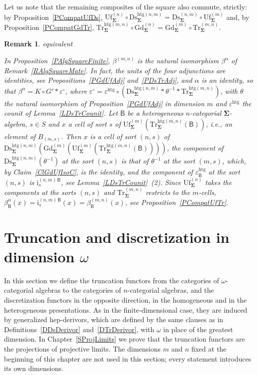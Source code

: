 \documentclass[a4paper, reqno]{amsbook}
\makeatletter
\newcommand{\sig}[1]{\mathbf{#1}}             %
\newcommand{\calg}[1]{\boldsymbol{\mathsf{#1}}} %
\newcommand{\htg}{\mathrm{htg}}                %
\newcommand{\Gd}{\mathrm{Gd}}
\newcommand{\Uf}{\mathrm{Uf}}
\newcommand{\Ds}{\mathrm{Ds}}
\newcommand{\Tr}{\mathrm{Tr}}
\theoremstyle{plain}
\newtheorem{remark}[theorem]{Remark}
\theoremstyle{definition}
\newcommand*{\CA@leanpending}{}
\newcommand*{\CA@leanrelation}{}
\newcommand*{\lean}[2]{%
  \ifcsname\string\color@lean@#1\endcsname\else
    \PackageError{main}{Unknown relation `#1' in \string\lean}{Use equivalent, weaker or stronger.}%
  \fi
  \gdef\CA@leanrelation{#1}%
  \gdef\CA@leanpending{#2}}
\makeatother
\begin{document}
Let us note that the remaining composites of the square also commute, strictly: by Proposition~\ref{PCompatUfDs}, $\Uf^{(n)}_{\sig{\Sigma}}\circ\Ds^{\htg(n,m)}_{\sig{\Sigma}}=\Ds^{(n,m)}_{\sig{\Sigma}}\circ\Uf^{(m)}_{\sig{\Sigma}}$ and, by Proposition~\ref{PCompatGdTr}, $\Tr^{\htg(m,n)}_{\sig{\Sigma}}\circ\Gd^{(n)}_{\sig{\Sigma}}=\Gd^{(m)}_{\sig{\Sigma}}\circ\Tr^{(m,n)}_{\sig{\Sigma}}$.

\begin{remark}\label{RAlgSquareFiniteMate}\lean{equivalent}{Dimensions.truncationUnificationFunctor_eq_conjugate}
In Proposition~\ref{PAlgSquareFinite}, $\beta^{(m,n)}$ is the natural isomorphism $\beta^{\alpha}$ of Remark~\ref{RAlgSquareMate}.
In fact, the units of the four adjunctions are identities, see Propositions~\ref{PGdUfAdj} and~\ref{PDsTrAdj}, and $\alpha$ is an identity, so that $\beta^{\alpha}=K\circ G'\ast\varepsilon^{\circ}$, where $\varepsilon^{\circ}=\varepsilon^{\htg}\circ(\Ds^{\htg(n,m)}_{\sig{\Sigma}}\ast\theta^{-1}\ast\Tr^{\htg(m,n)}_{\sig{\Sigma}})$, with $\theta$ the natural isomorphism of Proposition~\ref{PGdUfAdj} in dimension $m$ and $\varepsilon^{\htg}$ the counit of Lemma~\ref{LDsTrCounit}.
Let $\calg{B}$ be a heterogeneous $n$-categorial $\sig{\Sigma}$-algebra, $s\in S$ and $x$ a cell of sort $s$ of $\Uf^{(m)}_{\sig{\Sigma}}(\Tr^{\htg(m,n)}_{\sig{\Sigma}}(\calg{B}))$, i.e., an element of $B_{(m,s)}$.
Then $x$ is a cell of sort $(n,s)$ of $\Ds^{\htg(n,m)}_{\sig{\Sigma}}(\Gd^{(m)}_{\sig{\Sigma}}(\Uf^{(m)}_{\sig{\Sigma}}(\Tr^{\htg(m,n)}_{\sig{\Sigma}}(\calg{B}))))$, the component of $\Ds^{\htg(n,m)}_{\sig{\Sigma}}(\theta^{-1})$ at the sort $(n,s)$ is that of $\theta^{-1}$ at the sort $(m,s)$, which, by Claim~\ref{ClGdUfIsoC}, is the identity, and the component of $\varepsilon^{\htg}_{\calg{B}}$ at the sort $(n,s)$ is $\mathrm{i}^{(n,m)\,\calg{B}}_{s}$, see Lemma~\ref{LDsTrCounit}~(2).
Since $\Uf^{(n)}_{\sig{\Sigma}}$ takes the components at the sorts $(n,s)$ and $\Tr^{(m,n)}_{\sig{\Sigma}}$ restricts to the $m$-cells, $\beta^{\alpha}_{\calg{B}}(x)=\mathrm{i}^{(n,m)\,\calg{B}}_{s}(x)=\beta^{(m,n)}_{\calg{B}}(x)$, see Proposition~\ref{PCompatUfTr}.
\end{remark}

\section{Truncation and discretization in dimension \texorpdfstring{$\omega$}{omega}}\label{SDsTrOmega}

In this section we define the truncation functors from the categories of $\omega$-categorial algebras to the categories of $n$-categorial algebras, and the discretization functors in the opposite direction, in the homogeneous and in the heterogeneous presentations.
As in the finite-dimensional case, they are induced by generalized hep-derivors, which are defined by the same clauses as in Definitions~\ref{DDsDerivor} and~\ref{DTrDerivor}, with $\omega$ in place of the greatest dimension.
In Chapter~\ref{SProjLimits} we prove that the truncation functors are the projections of projective limits.
The dimensions $m$ and $n$ fixed at the beginning of this chapter are not used in this section; every statement introduces its own dimensions.
\end{document}
